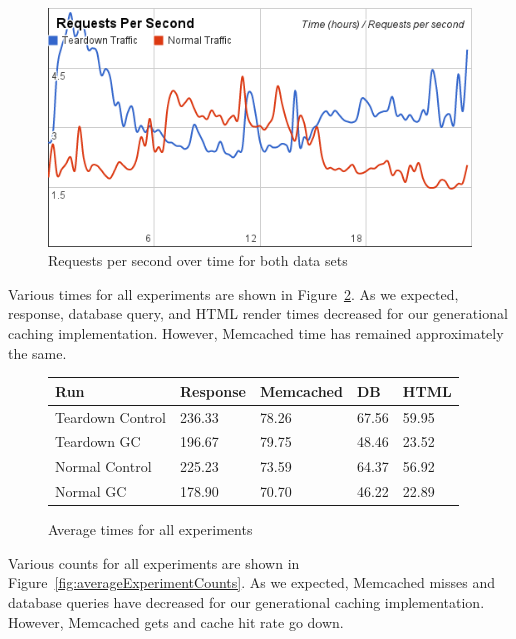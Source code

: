 \documentclass[12pt]{ucthesis}
\begin{document}
\begin{figure}[h]
\centering
\includegraphics[width=\textwidth]{assets/requestsPerSecXTime.png}
\caption{Requests per second over time for both data sets}
\label{fig:requestsPerSecXTime}
\end{figure}

Various times for all experiments are shown in Figure~\ref{fig:averageExperimentTimes}.
As we expected, response, database query, and HTML render times decreased for our generational caching implementation.
However, \textsf{Memcached} time has remained approximately the same.

\begin{figure}[h]
\begin{center}
\begin{tabular}{| l | l | l | l | l |}
   \hline
   Run & Response & Memcached & DB & HTML \\ \hline
   Teardown Control & 236.33 & 78.26 & 67.56 & 59.95 \\ \hline
   Teardown GC & 196.67 & 79.75 & 48.46 & 23.52 \\ \hline
   \hline
   Normal Control & 225.23 & 73.59 & 64.37 & 56.92 \\ \hline
   Normal GC & 178.90 & 70.70 & 46.22 & 22.89 \\
   \hline
\end{tabular}
\end{center}
\caption{Average times for all experiments}
\label{fig:averageExperimentTimes}
\end{figure}

Various counts for all experiments are shown in Figure~\ref{fig:averageExperimentCounts}.
As we expected, \textsf{Memcached} misses and database queries have decreased for our generational caching implementation.
However, \textsf{Memcached} gets and cache hit rate go down.
\end{document}
